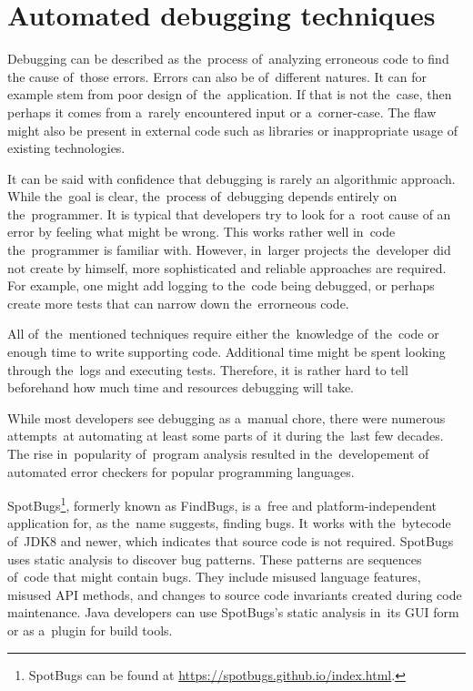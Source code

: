 \chapter{Automated debugging techniques}


Debugging can be described as the~process of~analyzing erroneous code to find 
the cause of~those errors. 
Errors can also be of~different natures.
It can for example stem from poor design of~the~application.
If that is not the~case, then perhaps it comes from a~rarely
encountered input or a~corner-case. 
The flaw might also be present
in external code such as libraries or inappropriate usage of
existing technologies.

It can be said with confidence that debugging is rarely an algorithmic
app\-roach.
While the~goal is clear, the~process of~debugging depends entirely 
on the~programmer.
It is typical that developers try to look for a~root cause
of an error by feeling what might be wrong.
This works rather well in~code the~programmer is familiar with.
However, in~larger projects the~developer did not create by himself,
more sophisticated and reliable approaches are required.
For example, one might add logging to the~code being debugged,
or perhaps create more tests that can narrow down the~errorneous code.

All of~the~mentioned techniques require either the~knowledge of~the~code 
or enough time to write supporting code. Additional time might be spent
looking through the~logs and executing tests. Therefore, it is rather
hard to tell be\-fore\-hand how much time and resources debugging will take.

While most developers see debugging as a~manual chore, there were numerous 
attempts~at automating at least some parts of~it during the~last few decades. 
The rise in~popularity of~program analysis resulted in the~developement of 
automated error checkers for popular programming languages. 

SpotBugs\footnote{SpotBugs can be found at 
\url{https://spotbugs.github.io/index.html}.}, formerly known as FindBugs, 
is a~free and platform-inde\-pen\-dent application for, as the~name 
suggests, finding bugs.
It works with the~bytecode of~JDK8 and newer, which indicates that source 
code is not required.
SpotBugs uses static analysis to discover bug patterns.
These patterns are sequences of~code that might contain bugs.
They include misused language features, misused API methods, and changes to 
source code invariants created during code maintenance.
Java developers can use SpotBugs's static analysis in~its GUI form or 
as a~plugin for build tools.

